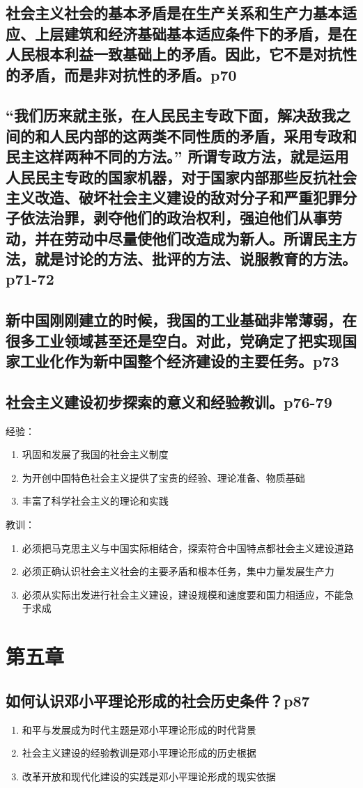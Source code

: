 \documentclass[UTF8]{ctexart}
\begin{document}
\subsection{社会主义社会的基本矛盾是在生产关系和生产力基本适应、上层建筑和经济基础基本适应条件下的矛盾，是在人民根本利益一致基础上的矛盾。因此，它不是对抗性的矛盾，而是非对抗性的矛盾。p70}
\subsection{“我们历来就主张，在人民民主专政下面，解决敌我之间的和人民内部的这两类不同性质的矛盾，采用专政和民主这样两种不同的方法。” 所谓专政方法，就是运用人民民主专政的国家机器，对于国家内部那些反抗社会主义改造、破坏社会主义建设的敌对分子和严重犯罪分子依法治罪，剥夺他们的政治权利，强迫他们从事劳动，并在劳动中尽量使他们改造成为新人。所谓民主方法，就是讨论的方法、批评的方法、说服教育的方法。p71-72}
\subsection{新中国刚刚建立的时候，我国的工业基础非常薄弱，在很多工业领域甚至还是空白。对此，党确定了把实现国家工业化作为新中国整个经济建设的主要任务。p73}
\subsection{社会主义建设初步探索的意义和经验教训。p76-79}
\par 经验：
\begin{enumerate}[(1)]
    \item 巩固和发展了我国的社会主义制度
    \item 为开创中国特色社会主义提供了宝贵的经验、理论准备、物质基础
    \item 丰富了科学社会主义的理论和实践
\end{enumerate}
\par 教训：
\begin{enumerate}[(1)]
    \item 必须把马克思主义与中国实际相结合，探索符合中国特点都社会主义建设道路
    \item 必须正确认识社会主义社会的主要矛盾和根本任务，集中力量发展生产力
    \item 必须从实际出发进行社会主义建设，建设规模和速度要和国力相适应，不能急于求成
\end{enumerate}
\section{第五章}
\subsection{如何认识邓小平理论形成的社会历史条件？p87}
\begin{enumerate}[(1)]
    \item 和平与发展成为时代主题是邓小平理论形成的时代背景
    \item 社会主义建设的经验教训是邓小平理论形成的历史根据
    \item 改革开放和现代化建设的实践是邓小平理论形成的现实依据
\end{enumerate}
\end{document}
